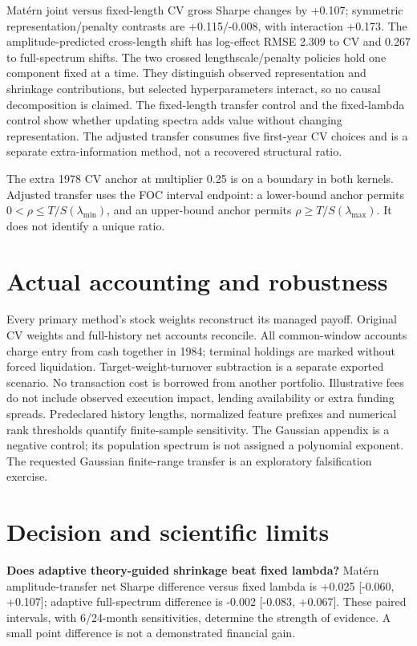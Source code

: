 \documentclass[11pt,letterpaper]{article}
\begin{document}
Matérn joint versus fixed-length CV gross Sharpe changes by +0.107; symmetric representation/penalty contrasts are +0.115/-0.008, with interaction +0.173. The amplitude-predicted cross-length shift has log-effect RMSE 2.309 to CV and 0.267 to full-spectrum shifts.
The two crossed lengthscale/penalty policies hold one component fixed at a time.
They distinguish observed representation and shrinkage contributions, but selected
hyperparameters interact, so no causal decomposition is claimed. The fixed-length
transfer control and the fixed-lambda control show whether updating spectra adds
value without changing representation. The adjusted transfer consumes five first-year
CV choices and is a separate extra-information method, not a recovered structural ratio.

The extra 1978 CV anchor at multiplier 0.25 is on a boundary in both kernels.
Adjusted transfer uses the FOC interval endpoint: a lower-bound anchor permits
$0<\rho\leq T/S(\lambda_{\min})$, and an upper-bound anchor permits
$\rho\geq T/S(\lambda_{\max})$. It does not identify a unique ratio.
\section*{Actual accounting and robustness}
Every primary method's stock weights reconstruct its managed payoff. Original CV
weights and full-history net accounts reconcile. All common-window accounts charge
entry from cash together in 1984; terminal holdings are marked without forced
liquidation. Target-weight-turnover subtraction is a separate exported scenario.
No transaction cost is borrowed from another portfolio. Illustrative fees do not
include observed execution impact, lending availability or extra funding spreads.
Predeclared history lengths, normalized feature prefixes and numerical rank thresholds
quantify finite-sample sensitivity. The Gaussian appendix is a negative control;
its population spectrum is not assigned a polynomial exponent. The requested
Gaussian finite-range transfer is an exploratory falsification exercise.
\newpage\section*{Decision and scientific limits}
\textbf{Does adaptive theory-guided shrinkage beat fixed lambda?} Matérn amplitude-transfer net Sharpe difference versus fixed lambda is +0.025 [-0.060, +0.107]; adaptive full-spectrum difference is -0.002 [-0.083, +0.067]. These paired intervals, with 6/24-month sensitivities, determine the strength of evidence. A small point difference is not a demonstrated financial gain.
\end{document}

